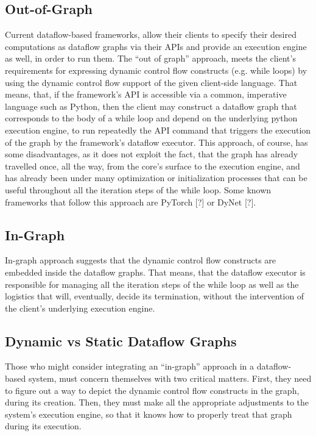 \documentclass[ack,preface]{dithesis}
\begin{document}
    \subsection{Out-of-Graph}
Current dataflow-based frameworks, allow their clients to specify their desired computations as dataflow graphs via their APIs and provide an execution engine as well, in order to run them. The “out of graph” approach, meets the client’s requirements for expressing dynamic control flow constructs (e.g. while loops) by using the dynamic control flow support of the given client-side language. That means, that, if the framework’s API is accessible via a common, imperative language such as Python, then the client may construct a dataflow graph that corresponds to the body of a while loop and depend on the underlying python execution engine, to run repeatedly the API command that triggers the execution of the graph by the framework’s dataflow executor. This approach, of course, has some disadvantages, as it does not exploit the fact, that the graph has already travelled once, all the way, from the core’s surface to the execution engine, and has already been under many optimization or initialization processes that can be useful throughout all the iteration steps of the while loop.
Some known frameworks that follow this approach are PyTorch [?] or DyNet [?].

    \subsection{In-Graph}
In-graph approach suggests that the dynamic control flow constructs are embedded inside the dataflow graphs. That means, that the dataflow executor is responsible for managing all the iteration steps of the while loop as well as the logistics that will, eventually, decide its termination, without the intervention of the client’s underlying execution engine.

    \subsection{Dynamic vs Static Dataflow Graphs}
Those who might consider integrating an “in-graph” approach in a dataflow-based system, must concern themselves with two critical matters. First, they need to figure out a way to depict the dynamic control flow constructs in the graph, during its creation. Then, they must make all the appropriate adjustments to the system’s execution engine, so that it knows how to properly treat that graph during its execution.
\end{document}
